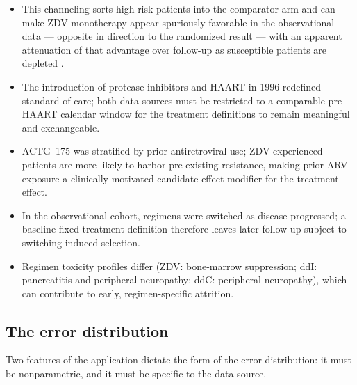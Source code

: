 \documentclass[11pt]{article}
\theoremstyle{plain}
\theoremstyle{definition}
\theoremstyle{remark}
\newcommand{\1}{\mathds{1}}
\begin{document}
\begin{itemize}
  \item This channeling sorts high-risk patients into the comparator arm and can make
        ZDV monotherapy appear spuriously favorable in the observational data ---
        opposite in direction to the randomized result --- with an apparent
        attenuation of that advantage over follow-up as susceptible patients are
        depleted \citep{hernan2010}.

  \item The introduction of protease inhibitors and HAART in 1996 redefined standard
        of care; both data sources must be restricted to a comparable pre-HAART
        calendar window for the treatment definitions to remain meaningful and
        exchangeable.

  \item ACTG~175 was stratified by prior antiretroviral use; ZDV-experienced patients
        are more likely to harbor pre-existing resistance, making prior ARV exposure
        a clinically motivated candidate effect modifier for the treatment effect.

  \item In the observational cohort, regimens were switched as disease progressed; a
        baseline-fixed treatment definition therefore leaves later follow-up subject
        to switching-induced selection.

  \item Regimen toxicity profiles differ (ZDV: bone-marrow suppression; ddI:
        pancreatitis and peripheral neuropathy; ddC: peripheral neuropathy), which
        can contribute to early, regimen-specific attrition.
\end{itemize}



\subsection{The error distribution}

Two features of the application dictate the form of the error distribution: it
must be nonparametric, and it must be specific to the data source.
\end{document}
